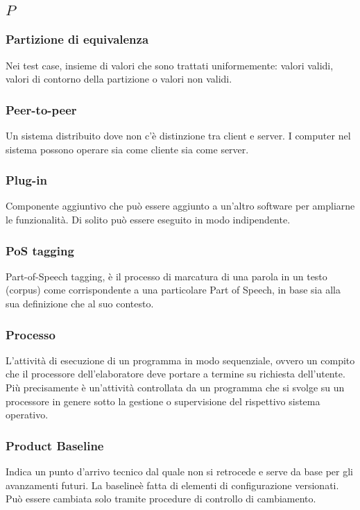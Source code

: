 \subsection*{\quad$P\quad$}
\subsubsection*{Partizione di equivalenza}
Nei test case, insieme di valori che sono trattati uniformemente: valori validi, valori di contorno della partizione o valori non validi.

\subsubsection*{Peer-to-peer}
Un sistema distribuito dove non c'è distinzione tra client e server. I computer nel sistema possono operare sia come cliente sia come server. 

\subsubsection*{Plug-in}
Componente aggiuntivo che può essere aggiunto a un'altro software per ampliarne le funzionalità. Di solito può essere eseguito in modo indipendente.

\subsubsection*{PoS tagging}
Part-of-Speech tagging, è il processo di marcatura di una parola in un testo (corpus) come corrispondente a una particolare Part of Speech\glosp , in base sia alla sua definizione che al suo contesto.

\subsubsection*{Processo}
L'attività di esecuzione di un programma in modo sequenziale, ovvero un compito che il processore dell'elaboratore deve portare a termine su richiesta dell'utente. Più precisamente è un'attività controllata da un programma che si svolge su un processore in genere sotto la gestione o supervisione del rispettivo sistema operativo.

\subsubsection*{Product Baseline}
Indica un punto d’arrivo tecnico dal quale non si retrocede e serve da base per gli avanzamenti futuri. La baseline\glosp è fatta di elementi di configurazione versionati. Può essere cambiata solo tramite procedure di controllo di cambiamento.

